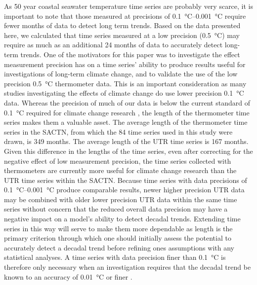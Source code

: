 \documentclass[]{ametsoc}
\begin{document}
As 50 year coastal seawater temperature time series are probably very scarce, it is important to note that those measured at precisions of \SIrange{0.1}{0.001}{\degreeCelsius} require fewer months of data to detect long term trends. Based on the data presented here, we calculated that time series measured at a low precision (\SI{0.5}{\degreeCelsius}) may require as much as an additional 24 months of data to accurately detect long-term trends. One of the motivators for this paper was to investigate the effect measurement precision has on a time series' ability to produce results useful for investigations of long-term climate change, and to validate the use of the low precision \SI{0.5}{\degreeCelsius} thermometer data. This is an important consideration as many studies investigating the effects of climate change \citep[\emph{e.g.}][]{Grant2010, Scherrer2010, Lathlean2012} do use lower precision \SI{0.1}{\degreeCelsius} data. Whereas the precision of much of our data is below the current standard of \SI{0.1}{\degreeCelsius} required for climate change research \citep{Ohring2005,Jarraud2008}, the length of the thermometer time series makes them a valuable asset. The average length of the thermometer time series in the SACTN, from which the 84 time series used in this study were drawn, is 349 months. The average length of the UTR time series is 167 months. Given this difference in the lengths of the time series, even after correcting for the negative effect of low measurement precision, the time series collected with thermometers are currently more useful for climate change research than the UTR time series within the SACTN. Because time series with data precisions of \SIrange{0.1}{0.001}{\degreeCelsius} produce comparable results, newer higher precision UTR data may be combined with older lower precision UTR data within the same time series without concern that the reduced overall data precision may have a negative impact on a model's ability to detect decadal trends. Extending time series in this way will serve to make them more dependable as length is the primary criterion through which one should initially assess the potential to accurately detect a decadal trend before refining ones assumptions with any statistical analyses. A time series with data precision finer than \SI{0.1}{\degreeCelsius} is therefore only necessary when an investigation requires that the decadal trend be known to an accuracy of \SI{0.01}{\degreeCelsius} or finer \citep[\emph{e.g.}][]{Karl2015}.
\end{document}
